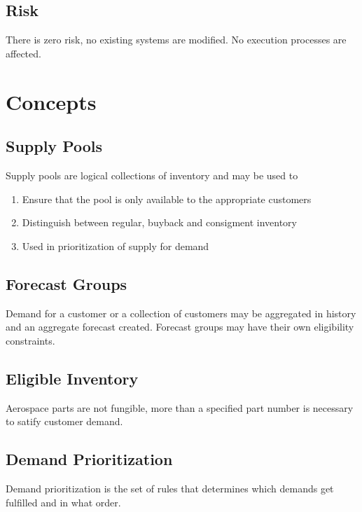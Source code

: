 \documentclass[letterpaper,10pt,english]{sphinxmanual}
\begin{document}
\section{Risk}
\label{\detokenize{BusinessProcessReengineering:risk}}
There is zero risk, no existing systems are modified. No execution
processes are affected.


\chapter{Concepts}
\label{\detokenize{BusinessProcessReengineering:concepts}}

\section{Supply Pools}
\label{\detokenize{BusinessProcessReengineering:supply-pools}}
Supply pools are logical collections of inventory and may be used to
\begin{enumerate}
%
\item {} 
Ensure that the pool is only available to the appropriate customers

\item {} 
Distinguish between regular, buyback and consigment inventory

\item {} 
Used in prioritization of supply for demand

\end{enumerate}


\section{Forecast Groups}
\label{\detokenize{BusinessProcessReengineering:forecast-groups}}
Demand for a customer or a collection of customers may be aggregated in
history and an aggregate forecast created. Forecast groups may have
their own eligibility constraints.


\section{Eligible Inventory}
\label{\detokenize{BusinessProcessReengineering:eligible-inventory}}
Aerospace parts are not fungible, more than a specified part number is
necessary to satify customer demand.


\section{Demand Prioritization}
\label{\detokenize{BusinessProcessReengineering:demand-prioritization}}
Demand prioritization is the set of rules that determines which demands
get fulfilled and in what order.
\end{document}
